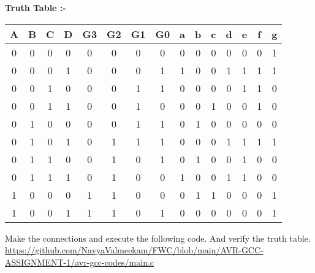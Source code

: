 \documentclass{article}
\begin{document}
\begin{multicols}{2}
\begin{center}
\begin{tableofcontents}
\newpage
\textbf{Truth Table :-}
\vspace{5MM}
\begin{tabular}{|c|c|c|c|c|c|c|c|c|c|c|c|c|c|c|}
\hline
\textbf{A} & {B} & {C} & {D} & {G3} & {G2} & {G1} & {G0} & {a} & {b} & {c} & {d} & {e} & {f} & {g} \\
\hline
0 & 0 & 0 & 0 & 0 & 0 & 0 & 0 & 0 & 0 & 0 & 0 & 0 & 0 & 1 \\
\hline
0 & 0 & 0 & 1 & 0 & 0 & 0 & 1 & 1 & 0 & 0 & 1 & 1 & 1 & 1 \\
\hline
0 & 0 & 1 & 0 & 0 & 0 & 1 & 1 & 0 & 0 & 0 & 0 & 1 & 1 & 0 \\
\hline
0 & 0 & 1 & 1 & 0 & 0 & 1 & 0 & 0 & 0 & 1 & 0 & 0 & 1 & 0 \\
\hline
0 & 1 & 0 & 0 & 0 & 0 & 1 & 1 & 0 & 1 & 0 & 0 & 0 & 0 & 0 \\
\hline
0 & 1 & 0 & 1 & 0 & 1 & 1 & 1 & 0 & 0 & 0 & 1 & 1 & 1 & 1 \\
\hline
0 & 1 & 1 & 0 & 0 & 1 & 0 & 1 & 0 & 1 & 0 & 0 & 1 & 0 & 0 \\
\hline 
0 & 1 & 1 & 1 & 0 & 1 & 0 & 0 & 1 & 0 & 0 & 1 & 1 & 0 & 0 \\
\hline
1 & 0 & 0 & 0 & 1 & 1 & 0 & 0 & 0 & 1 & 1 & 0 & 0 & 0 & 1 \\
\hline
1 & 0 & 0 & 1 & 1 & 1 & 0 & 1 & 0 & 0 & 0 & 0 & 0 & 0 & 1 \\
\hline
\end{tabular}

\end{tableofcontents}
\end{center}
Make the connections and execute the following code. And verify the truth table. 
\newline
\newline
\url{https://github.com/NavyaValmeekam/FWC/blob/main/AVR-GCC-ASSIGNMENT-1/avr-gcc-codes/main.c}
\maketitle
\newpage
\bigskip
\renewcommand{\thefigure}{\theenumi}
\renewcommand{\thetable}{\theenumi}
%
%



\end{multicols}
\end{document}

